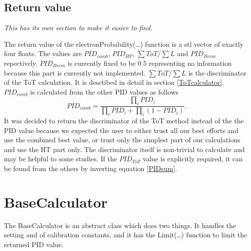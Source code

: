 \documentclass[a4paper,11pt]{article}
\begin{document}
\subsection{Return value}

\emph{This has its own section to make it easier to find. }

The return value of the electronProbability(\ldots) function is a stl
vector of exactly four floats. The values are $PID_{comb}$,
$PID_{HT}$, $\sum ToT / \sum L$ and $PID_{Brem}$
repectively. $PID_{Brem}$ is currently fixed to be $0.5$ representing
no information because this part is currently not implemented. $\sum
ToT / \sum L$ is the discriminator of the ToT calculation. It is
desctibed in detail in section \ref{ToTcalculator}.  $PID_{comb}$ is
calculated from the other PID values as follows
\begin{equation}
  \label{PIDsum}
  PID_{comb}=\frac{\displaystyle{\prod_iPID_i}}{\displaystyle{ \prod_iPID_i + \prod_i(1-PID_i)}} .
\end{equation}
It was decided to return the discriminator of the ToT method instead
of the the PID value because we expected the user to either trust all
our best efforts and use the combined best value, or trust only the
simplest part of our calculations and use the HT part only. The
discriminator itself is non-trivial to calculate and may be helpful to
some studies. If the $PID_{ToT}$ value is explicitly required, it can
be found from the others by inverting equation \ref{PIDsum}.

\section{BaseCalculator}
The BaseCalculator is an abstract class which does two things. It
handles the setting and of calibration constants, and it has the
Limit(\ldots) function to limit the returned PID value.
\end{document}
